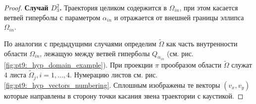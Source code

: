 \begin{proof}

\medskip
\textbf{Случай $D_3^2$.}
Траектория целиком содержится в $\Omega_{in}$, при этом касается ветвей гиперболы с параметром $\alpha_{in}$ и отражается от внешней границы эллипса $\Omega_{in}$.

По аналогии с предыдущими случаями определим $\widetilde{\Omega}$ как часть внутренности области $\Omega_{in}$, лежащую между ветвей гиперболы $Q_{\alpha_{in}}$ (см. рис. \ref{fig:pt9:_hyp_domain_example}). При проекции $\pi$ прообразом области  $\widetilde{\Omega}$ служат 4 листа $\widetilde{\Omega}_{j}, i=1, \ldots, 4$. Нумерацию листов см. рис. \ref{fig:pt9:_hyp_vectors_numbering}. Сплошным изображены те векторы $(v_x, v_y)$ которые направлены в сторону точки касания звена траектории с каустикой.


\end{proof}
